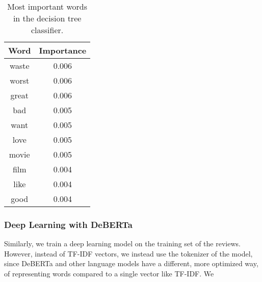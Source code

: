 \documentclass[12pt]{article}    %
\begin{document}
\begin{table}
    \centering
    \begin{tabular}{|c|c|}
        \hline
        Word & Importance \\
        \hline
        waste & 0.006 \\
        worst & 0.006 \\
        great & 0.006 \\
        bad & 0.005 \\
        want & 0.005 \\
        love & 0.005 \\
        movie & 0.005 \\
        film & 0.004 \\
        like & 0.004 \\
        good & 0.004 \\
        \hline
    \end{tabular}
    \caption{Most important words in the decision tree classifier.}
    \label{fig:decision_tree_words}
\end{table}


\subsubsection{Deep Learning with DeBERTa}

Similarly, we train a deep learning model on the training set of the reviews. However, instead of TF-IDF vectors, we instead use the tokenizer of the model, since DeBERTa and other language models have a different, more optimized way, of representing words compared to a single vector like TF-IDF. We 

\printbibliography
\end{document}
